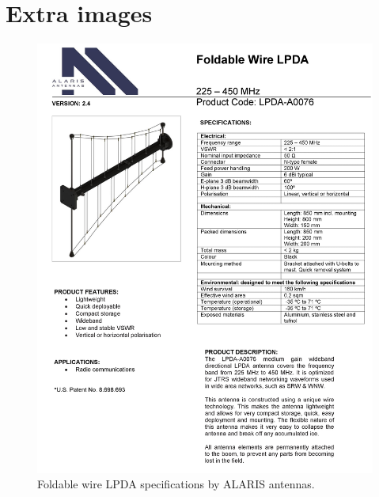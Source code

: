 
\section{Extra images}
\begin{figure}[htb]
    \centering
    \includegraphics[width=1\textwidth]{figures/Yannis/LPDA.jpg}
    \caption{Foldable wire LPDA specifications by ALARIS antennas.}
    \label{LPDA1}
\end{figure}

